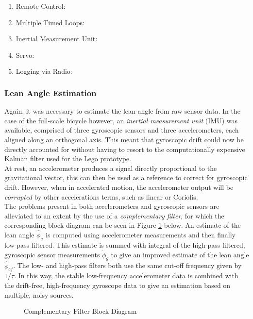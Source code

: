 \begin{enumerate}
\item{Remote Control:}
\item{Multiple Timed Loops:}
\item{Inertial Measurement Unit:}
\item{Servo:}
\item{Logging via Radio:}
\end{enumerate}

\subsubsection{Lean Angle Estimation}
Again, it was necessary to estimate the lean angle from raw sensor data. In the case of the full-scale bicycle however, an \textit{inertial measurement unit} (IMU) was available, comprised of three gyroscopic sensors and three accelerometers, each aligned along an orthogonal axis. This meant that gyroscopic drift could now be directly accounted for without having to resort to the computationally expensive Kalman filter used for the Lego prototype.\\

At rest, an accelerometer produces a signal directly proportional to the gravitational vector, this can then be used as a reference to correct for gyroscopic drift. However, when in accelerated motion, the accelerometer output will be \textit{corrupted} by other accelerations terms, such as linear or Coriolis. \\

The problems present in both accelerometers and gyroscopic sensors are alleviated to an extent by the use of a \textit{complementary filter}, for which the corresponding block diagram can be seen in Figure \ref{fig:CF} below. An estimate of the lean angle $\hat{\phi}_a$ is computed using accelerometer measurements and then finally low-pass filtered. This estimate is summed with integral of the high-pass filtered, gyroscopic sensor measurements $\dot{\phi}_g$ to give an improved estimate of the lean angle $\hat{\phi}_{cf}$. The low- and high-pass filters both use the same cut-off frequency given by $1/\tau$. In this way, the stable low-frequency accelerometer data is combined with the drift-free, high-frequency gyroscope data to give an estimation based on multiple, noisy sources.

\begin{figure}[H]
	\centering
    \def\svgwidth{0.5\textwidth}
    
    \caption{Complementary Filter Block Diagram}
	\label{fig:CF}
\end{figure}

